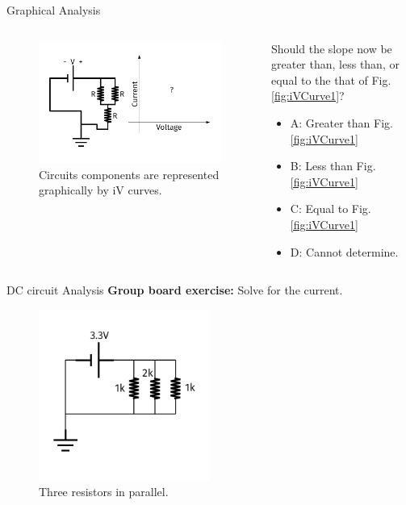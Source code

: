 \documentclass{beamer}
\begin{document}
\begin{frame}{Graphical Analysis}
\begin{columns}[T]
\begin{column}{0.5\textwidth}
\begin{figure}
\centering
\includegraphics[width=\textwidth,trim=0.5cm 0cm 1cm 0cm,clip=true]{figures/iVCurve4.pdf}
\caption{\label{fig:iVCurve4} Circuits components are represented graphically by iV curves.}
\end{figure}
\end{column}
\begin{column}{0.5\textwidth}
\small
Should the slope now be greater than, less than, or equal to the that of Fig. \ref{fig:iVCurve1}?
\begin{itemize}
\item A: Greater than Fig. \ref{fig:iVCurve1}
\item B: Less than Fig. \ref{fig:iVCurve1}
\item C: Equal to Fig. \ref{fig:iVCurve1}
\item D: Cannot determine.
\end{itemize}
\end{column}
\end{columns}
\end{frame}

\begin{frame}{DC circuit Analysis}
\textbf{Group board exercise:} Solve for the current.
\begin{figure}
\centering
\includegraphics[width=0.5\textwidth]{figures/iVCurve5.pdf}
\caption{\label{fig:iVCurve5} Three resistors in parallel.}
\end{figure}
\end{frame}
\end{document}
